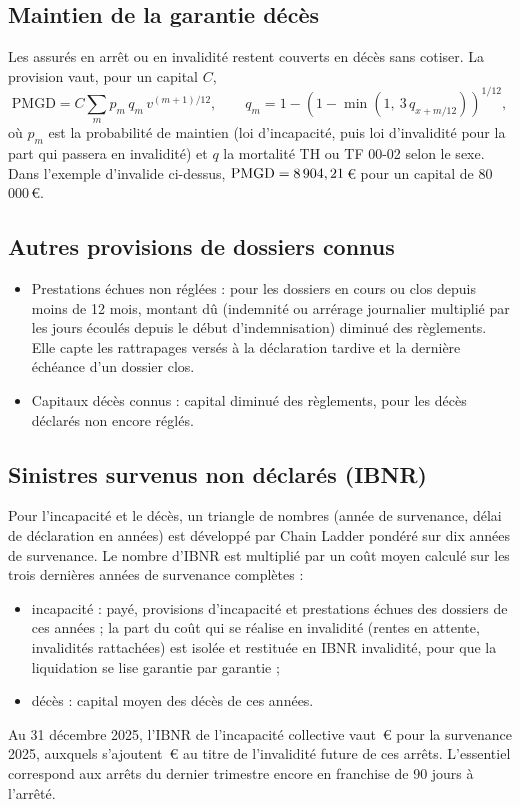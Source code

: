 \documentclass[11pt,a4paper]{article}
\newcommand{\eur}{\,€}
\begin{document}
\subsection{Maintien de la garantie décès}
Les assurés en arrêt ou en invalidité restent couverts en décès sans cotiser. La provision vaut, pour un capital $C$,
\[
\mathrm{PMGD} = C \sum_{m} p_m\, q_m\, v^{(m+1)/12}, \qquad q_m = 1 - \left(1 - \min(1,\ 3\, q_{x+m/12})\right)^{1/12},
\]
où $p_m$ est la probabilité de maintien (loi d'incapacité, puis loi d'invalidité pour la part qui passera en invalidité) et $q$ la mortalité TH ou TF 00-02 selon le sexe. Dans l'exemple d'invalide ci-dessus, $\mathrm{PMGD} = 8\,904,21$\eur{} pour un capital de 80\,000\eur.

\subsection{Autres provisions de dossiers connus}
\begin{itemize}
\item Prestations échues non réglées : pour les dossiers en cours ou clos depuis moins de 12 mois, montant dû (indemnité ou arrérage journalier multiplié par les jours écoulés depuis le début d'indemnisation) diminué des règlements. Elle capte les rattrapages versés à la déclaration tardive et la dernière échéance d'un dossier clos.
\item Capitaux décès connus : capital diminué des règlements, pour les décès déclarés non encore réglés.
\end{itemize}

\subsection{Sinistres survenus non déclarés (IBNR)}
Pour l'incapacité et le décès, un triangle de nombres (année de survenance, délai de déclaration en années) est développé par Chain Ladder pondéré sur dix années de survenance. Le nombre d'IBNR est multiplié par un coût moyen calculé sur les trois dernières années de survenance complètes :
\begin{itemize}
\item incapacité : payé, provisions d'incapacité et prestations échues des dossiers de ces années ; la part du coût qui se réalise en invalidité (rentes en attente, invalidités rattachées) est isolée et restituée en IBNR invalidité, pour que la liquidation se lise garantie par garantie ;
\item décès : capital moyen des décès de ces années.
\end{itemize}
Au 31 décembre 2025, l'IBNR de l'incapacité collective vaut \ibnrIncCol\eur{} pour la survenance 2025, auxquels s'ajoutent \ibnrInvCol\eur{} au titre de l'invalidité future de ces arrêts. L'essentiel correspond aux arrêts du dernier trimestre encore en franchise de 90 jours à l'arrêté.
\end{document}
